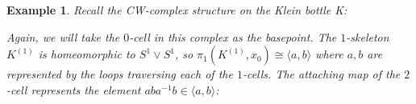 \documentclass[11pt, letterpaper, oneside]{report}
\theoremstyle{pplain}
\theoremstyle{ddefinition}
\newtheorem{example}[theorem]{Example}
\theoremstyle{nnn}
\theoremstyle{eexercise}
\begin{document}
\begin{example} 
Recall the CW-complex structure on the Klein bottle K:


Again, we will take the  $0$-cell in this complex as the basepoint.  
The $1$-skeleton $K^{(1)}$ is homeomorphic to $S^{1}\vee S^{1}$, so 
$\pi_{1}(K^{(1)}, x_{0}) \cong \langle a, b \rangle$ where $a, b$ are represented by the loops 
traversing each of the $1$-cells. The attaching map of the $2$-cell represents the element 
$aba^{-1}b\in \langle a, b \rangle$:


\end{example}
\end{document}
